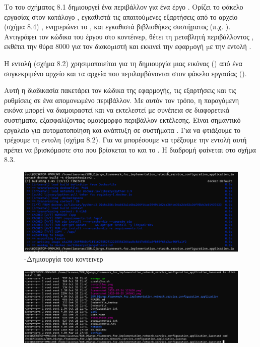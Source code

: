 \FloatBarrier


Tο  του σχήματος 8.1 δηµιουργεί ένα περιβάλλον  για ένα έργο . Ορίζει το φάκελο εργασίας στον κατάλογο , εγκαθιστά τις απαιτούµενες εξαρτήσεις από το αρχείο (σχήμα 8.4) , ενηµερώνει το , και εγκαθιστά βιβλιοθήκες συστήµατος (π.χ. ). Αντιγράφει τον κώδικα του έργου  στο κοντέινερ, θέτει τη µεταβλητή περιβάλλοντος , εκθέτει την θύρα 8000 για τον διακοµιστή  και εκκινεί την εφαρµογή µε την εντολή .


Η εντολή (σχήμα 8.2) χρησιμοποιείται για τη δημιουργία μιας εικόνας  () 
από ένα συγκεκριμένο αρχείο  και τα αρχεία που περιλαμβάνονται στον φάκελο εργασίας ().

Αυτή η διαδικασία πακετάρει τον κώδικα της εφαρμογής, τις εξαρτήσεις και τις ρυθμίσεις σε ένα απομονωμένο περιβάλλον. 
Με αυτόν τον τρόπο, η παραγόμενη εικόνα μπορεί να διαμοιραστεί και να εκτελεστεί με συνέπεια σε διαφορετικά συστήματα, 
εξασφαλίζοντας ομοιόμορφο περιβάλλον εκτέλεσης. Είναι σημαντικό εργαλείο για αυτοματοποίηση και ανάπτυξη σε συστήματα . Για να φτιάξουμε το  τρέχουμε τη εντολη (σχήμα 8.2). Για να μπορέσουμε να τρέξουμε την εντολή αυτή πρέπει να βρισκόμαστε στο  που βρίσκεται το  και το . Η διαδρομή φαίνεται στο σχήμα 8.3. 

\FloatBarrier

\begin{figure}[h]
	\centering
	\includegraphics[width=1.0\textwidth]{graphics/docker_build_v2.png}
	\caption{-Δημιουργία του κοντεινερ}
\end{figure}

\FloatBarrier


\FloatBarrier

\begin{figure}[h]
	\centering
	\includegraphics[width=1.0\textwidth]{graphics/dockerfile_location.png}
	\caption{}
\end{figure}

